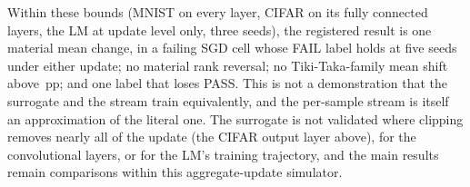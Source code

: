 Within these bounds (MNIST on every layer, CIFAR on its fully connected layers, the LM at update level only, three seeds), the
registered result is one material mean change, in a failing SGD cell whose FAIL label holds at five seeds under either update; no
material rank reversal; no Tiki-Taka-family mean shift above \RXFidTtMaxAbs\,pp; and one label that loses PASS. This is not a
demonstration that the surrogate and the stream train equivalently, and the per-sample stream is itself an approximation of the
literal one. The surrogate is not validated where clipping removes nearly all of the update (the CIFAR output layer above), for
the convolutional layers, or for the LM's training trajectory, and the main results remain comparisons within this
aggregate-update simulator.




